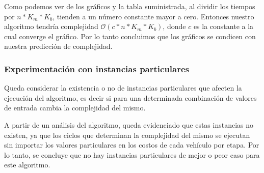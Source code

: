 Como podemos ver de los gráficos y la tabla suministrada, al dividir los tiempos por $n*K_m*K_b$, tienden a un número constante mayor a cero. Entonces nuestro algoritmo tendría complejidad $\mathcal{O}(c*n*K_m*K_b)$, donde $c$ es la constante a la cual converge el gráfico. Por lo tanto concluimos que los gráficos se condicen con nuestra predicción de complejidad.

\subsubsection{Experimentación con instancias particulares}
Queda considerar la existencia o no de instancias particulares que afecten la ejecución del algoritmo, es decir si para una determinada combinación de valores de entrada cambia la complejidad del mismo.

A partir de un análisis del algoritmo, queda evidenciado que estas instancias no existen, ya que los ciclos que determinan la complejidad del mismo se ejecutan sin importar los valores particulares en los costos de cada vehículo por etapa. Por lo tanto, se concluye que no hay instancias particulares de mejor o peor caso para este algoritmo.
